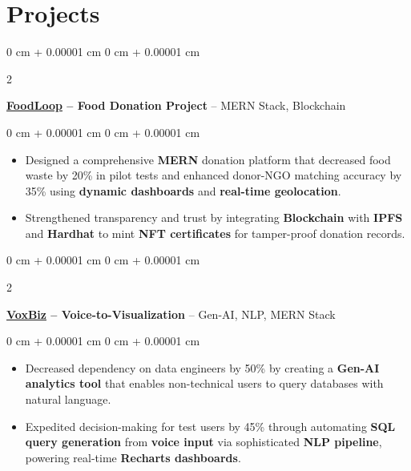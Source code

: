 \documentclass[10pt, letterpaper]{article}
\newenvironment{highlights}{
    \begin{itemize}[
        topsep=0.10 cm,
        parsep=0.10 cm,
        partopsep=0pt,
        itemsep=0pt,
        leftmargin=0 cm + 10pt
    ]
}{
    \end{itemize}
} %
\newenvironment{onecolentry}{
    \begin{adjustwidth}{
        0 cm + 0.00001 cm
    }{
        0 cm + 0.00001 cm
    }
}{
    \end{adjustwidth}
} %
\newenvironment{twocolentry}[2][]{
    \onecolentry
    \def\secondColumn{#2}
    \setcolumnwidth{\fill, 4.5 cm}
    \begin{paracol}{2}
}{
    \switchcolumn \raggedleft \secondColumn
    \end{paracol}
    \endonecolentry
} %
\begin{document}
    \section{Projects}

      \begin{twocolentry}{
    \href{https://github.com/ritheshan/FoodLoop}{\faGithub}
}
    \textbf{\href{https://food-loop-123.vercel.app}{\underline{\textcolor{blueHighlight}{\large FoodLoop}}} – Food Donation Project} -- {MERN Stack}, {Blockchain}
\end{twocolentry}

\vspace{0.10 cm}
\begin{onecolentry}
    \begin{highlights}
        \item Designed a comprehensive \textbf{MERN} donation platform that decreased food waste by 20\% in pilot tests and enhanced donor-NGO matching accuracy by 35\% using \textbf{dynamic dashboards} and \textbf{real-time geolocation}.  
        \item Strengthened transparency and trust by integrating \textbf{Blockchain} with \textbf{IPFS} and \textbf{Hardhat} to mint \textbf{NFT certificates} for tamper-proof donation records.  
    \end{highlights}
\end{onecolentry}
        \vspace{0.2 cm}

        \begin{twocolentry}{
    \href{https://github.com/ritheshan/VoxBiz}{\faGithub}
}
    \textbf{\href{https://voxbiz.vercel.app/}{\underline{\textcolor{blueHighlight}{\large VoxBiz}}} – Voice-to-Visualization} -- {Gen-AI}, {NLP}, {MERN Stack}
\end{twocolentry}

\vspace{0.10 cm}
\begin{onecolentry}
    \begin{highlights}
        \item Decreased dependency on data engineers by 50\% by creating a \textbf{Gen-AI analytics tool} that enables non-technical users to query databases with natural language.
        \item Expedited decision-making for test users by 45\% through automating \textbf{SQL query generation} from \textbf{voice input} via sophisticated \textbf{NLP pipeline}, powering real-time \textbf{Recharts dashboards}.
    \end{highlights}
\end{onecolentry}
\end{document}
